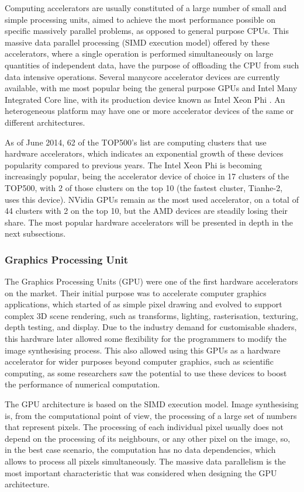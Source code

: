 Computing accelerators are usually constituted of a large number of small and simple processing units, aimed to achieve the most performance possible on specific massively parallel problems, as opposed to general purpose CPUs. This massive data parallel processing (SIMD execution model) offered by these accelerators, where a single operation is performed simultaneously on large quantities of independent data, have the purpose of offloading the CPU from such data intensive operations. Several manycore accelerator devices are currently available, with me most popular being the general purpose GPUs and Intel Many Integrated Core line, with its production device known as Intel Xeon Phi \cite{Intel:MIC}. An heterogeneous platform may have one or more accelerator devices of the same or different architectures.

As of June 2014, 62 of the TOP500’s list \cite{TOP500} are computing clusters that use hardware accelerators, which indicates an exponential growth of these devices popularity compared to previous years. The Intel Xeon Phi is becoming increasingly popular, being the accelerator device of choice in 17 clusters of the TOP500, with 2 of those clusters on the top 10 (the fastest cluster, Tianhe-2, uses this device). NVidia GPUs remain as the most used accelerator, on a total of 44 clusters with 2 on the top 10, but the AMD devices are steadily losing their share. The most popular hardware accelerators will be presented in depth in the next subsections.

\subsubsection*{Graphics Processing Unit}
\label{gpu}

The Graphics Processing Units (GPU) were one of the first hardware accelerators on the market. Their initial purpose was to accelerate computer graphics applications, which started of as simple pixel drawing and evolved to support complex 3D scene rendering, such as transforms, lighting, rasterisation, texturing, depth testing, and display. Due to the industry demand for customisable shaders, this hardware later allowed some flexibility for the programmers to modify the image synthesising process. This also allowed using this GPUs as a hardware accelerator for wider purposes beyond computer graphics, such as scientific computing, as some researchers saw the potential to use these devices to boost the performance of numerical computation.

The GPU architecture is based on the SIMD execution model. Image synthesising is, from the computational point of view, the processing of a large set of numbers that represent pixels. The processing of each individual pixel usually does not depend on the processing of its neighbours, or any other pixel on the image, so, in the best case scenario, the computation has no data dependencies, which allows to process all pixels simultaneously. The massive data parallelism is the most important characteristic that was considered when designing the GPU architecture.

